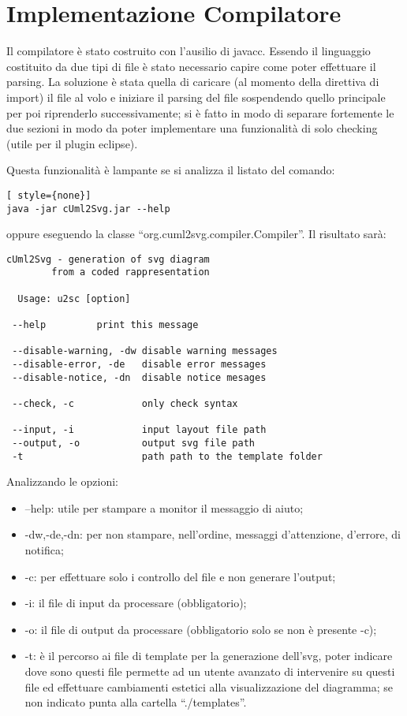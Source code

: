 \section{Implementazione Compilatore}

Il compilatore è stato costruito con l'ausilio di javacc. Essendo il linguaggio
costituito da due tipi di file è stato necessario capire come poter effettuare
il parsing. La soluzione è stata quella di caricare (al momento della direttiva
di import) il file al volo e iniziare il parsing del file sospendendo
quello principale per poi riprenderlo successivamente; si è fatto in modo di
separare fortemente le due sezioni in modo da poter implementare una
funzionalità di solo checking (utile per il plugin eclipse).

Questa funzionalità è lampante se si analizza il listato del comando:

\begin{lstlisting}[ style={none}]
java -jar cUml2Svg.jar --help
\end{lstlisting}

oppure eseguendo la classe ``org.cuml2svg.compiler.Compiler''. Il risultato sarà:

\begin{lstlisting}[caption={Output dell'help da linea di comando}, style={none}]
cUml2Svg - generation of svg diagram
        from a coded rappresentation

  Usage: u2sc [option]
 
 --help         print this message
 
 --disable-warning, -dw disable warning messages
 --disable-error, -de   disable error messages
 --disable-notice, -dn  disable notice mesages
 
 --check, -c            only check syntax
 
 --input, -i            input layout file path
 --output, -o           output svg file path
 -t                     path path to the template folder
\end{lstlisting}

Analizzando le opzioni:

\begin{itemize}
  \item --help: utile per stampare a monitor il messaggio di aiuto;
  \item -dw,-de,-dn: per non stampare, nell'ordine, messaggi d'attenzione,
  d'errore, di notifica;
  \item -c: per effettuare solo i controllo del file e non generare l'output;
  \item -i: il file di input da processare (obbligatorio);
  \item -o: il file di output da processare (obbligatorio solo se non è presente
  -c);
  \item -t: è il percorso ai file di template per la generazione dell'svg, poter
  indicare dove sono questi file permette ad un utente avanzato di intervenire
  su questi file ed effettuare cambiamenti estetici alla visualizzazione del
  diagramma; se non indicato punta alla cartella ``./templates''.
\end{itemize} 


